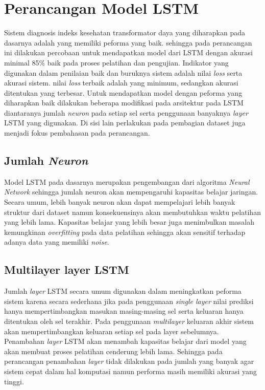 \section{Perancangan Model LSTM}

Sistem diagnosis indeks kesehatan transformator daya yang diharapkan pada dasarnya adalah yang memiliki peforma yang baik. sehingga pada perancangan ini dilakukan percobaan untuk mendapatkan model dari LSTM dengan akurasi minimal 85\% baik pada proses pelatihan dan pengujian. Indikator yang digunakan dalam penilaian baik dan buruknya sistem adalah nilai \textit{loss} serta akurasi sistem. nilai \textit{loss} terbaik adalah yang minimum, sedangkan akurasi ditentukan yang terbesar. Untuk mendapatkan model dengan peforma yang diharapkan baik dilakukan beberapa modifikasi pada arsitektur pada LSTM diantaranya jumlah \textit{neuron} pada setiap sel serta penggunaan banyaknya \textit{layer} LSTM yang digunakan. Di sisi lain perlakukan pada pembagian dataset juga menjadi fokus pembahasan pada perancangan.

\subsection{Jumlah \textit{Neuron}}
Model LSTM pada dasarnya merupakan pengembangan dari algoritma \textit{Neural Network} sehingga jumlah neuron akan mempengaruhi kapasitas belajar jaringan. Secara umum, lebih banyak neuron akan dapat mempelajari lebih banyak struktur dari dataset namun konsekuensinya akan membutuhkan waktu pelatihan yang lebih lama. Kapasitas belajar yang lebih besar juga menimbulkan masalah kemungkinan \textit{overfitting} pada data pelatihan sehingga akan sensitif terhadap adanya data yang memiliki \textit{noise}.

\subsection{Multilayer layer LSTM}
Jumlah \textit{layer} LSTM secara umum digunakan dalam meningkatkan peforma sistem karena secara sederhana jika pada penggunaan \textit{single layer} nilai prediksi hanya mempertimbangkan masukan masing-masing sel serta keluaran hanya ditentukan oleh sel terakhir. Pada penggunaan \textit{multilayer} keluaran akhir sistem akan mempertimbangkan keluaran setiap sel pada layer sebelumnya. Penambahan \textit{layer} LSTM akan menambah kapasitas belajar dari model yang akan membuat proses pelatihan cenderung lebih lama. Sehingga pada perancangan penambahan \textit{layer} tidak dilakukan pada jumlah yang banyak agar sistem cepat dalam hal komputasi namun performa masih memiliki akurasi yang tinggi. 

